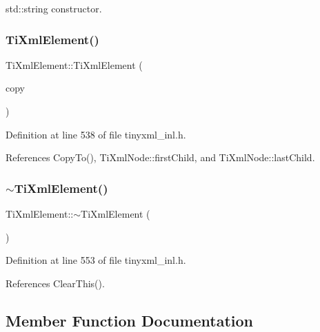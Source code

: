 std\+::string constructor. 

\hypertarget{class_ti_xml_element_a1ca4465f3c2eac6a60e641cd7f1d9f7e}{}\label{class_ti_xml_element_a1ca4465f3c2eac6a60e641cd7f1d9f7e} 
\subsubsection{\texorpdfstring{Ti\+Xml\+Element()}{TiXmlElement()}\hspace{0.1cm}{\footnotesize\ttfamily [3/3]}}
{\footnotesize\ttfamily Ti\+Xml\+Element\+::\+Ti\+Xml\+Element (\begin{DoxyParamCaption}\item[{const \hyperlink{class_ti_xml_element}{Ti\+Xml\+Element} \&}]{copy }\end{DoxyParamCaption})}



Definition at line 538 of file tinyxml\+\_\+inl.\+h.



References Copy\+To(), Ti\+Xml\+Node\+::first\+Child, and Ti\+Xml\+Node\+::last\+Child.

\hypertarget{class_ti_xml_element_aa049a47c5081c0d021968666360da261}{}\label{class_ti_xml_element_aa049a47c5081c0d021968666360da261} 
\subsubsection{\texorpdfstring{$\sim$\+Ti\+Xml\+Element()}{~TiXmlElement()}}
{\footnotesize\ttfamily Ti\+Xml\+Element\+::$\sim$\+Ti\+Xml\+Element (\begin{DoxyParamCaption}{ }\end{DoxyParamCaption})\hspace{0.3cm}{\ttfamily [virtual]}}



Definition at line 553 of file tinyxml\+\_\+inl.\+h.



References Clear\+This().



\subsection{Member Function Documentation}
\hypertarget{class_ti_xml_element_a01d33358cce9d1817b557d314dda3779}{}\label{class_ti_xml_element_a01d33358cce9d1817b557d314dda3779} 
